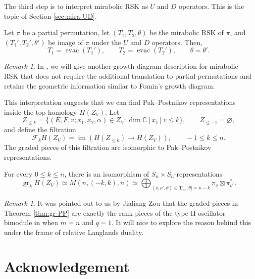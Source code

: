 \documentclass[12pt,a4paper]{article}
\def\evac{\operatorname{evac}}
\theoremstyle{plain}
\newenvironment{repthm}[1]
  {\renewcommand\theinnercustomthm{#1}\innercustomthm}
  {\endinnercustomthm}
\theoremstyle{definition}
\theoremstyle{remark}
\newtheorem{remark}[thm]{Remark}
\newcommand{\gr}{\operatorname{gr}}
\newcommand{\im}{\operatorname{im}}
\newcommand{\bfT}{\mathbf{T}}
\newcommand{\scrF}{\mathscr{F}}
\newcommand{\CC}{\mathbb{C}}
\begin{document}
    The third step is to interpret mirabolic RSK as $U$ and $D$ operators. This is the topic of Section \ref{sec:mira-UD}.

    \begin{repthm}{\ref{thm:mira-UD}}
        Let $\pi$ be a partial permutation, let $(T_1,T_2,\theta)$ be the mirabolic RSK of $\pi$, and $(T_1',T_2',\theta')$ be image of $\pi$ under the $U$ and $D$ operators. Then,
        \[
        T_1 = \evac(T_1'),\qquad T_2 = \evac(T_2'),\qquad \theta = \theta'.
        \]
    \end{repthm}

    \begin{remark}
        In \cite{nguyen2026rsk}, we will give another growth diagram description for mirabolic RSK that does not require the additional translation to partial permutations and retains the geometric information similar to Fomin's growth diagram.
    \end{remark}

    This interpretation suggests that we can find Pak--Postnikov representations inside the top homology $H(Z_V)$. Let
    \[
    Z_{\leq k}=\{(E,F,v;x_1,x_2,\alpha)\in Z_V:\dim \CC[x_1]v\leq k\},\qquad Z_{\le-1}=\varnothing,
    \]
    and define the filtration
    \[
    \scrF_k H(Z_V)=\im \left(H(Z_{\leq k}) \longrightarrow H(Z_V)\right), \qquad -1\leq k\leq n.
    \]
    The graded pieces of this filtration are isomorphic to Pak--Postnikov representations.
    
    \begin{repthm}{\ref{thm:gr-PP}}
        For every $0\leq k\leq n$, there is an isomorphism of $S_n\times S_n$-representations
        \[
        \gr_k H(Z_V) \simeq M(n,(-k,k),n) \simeq \bigoplus_{(\nu,\nu',\theta)\in \bfT_n, |\theta| = n-k} \pi_\nu \boxtimes \pi^*_{\nu'}.
        \]
    \end{repthm}

    \begin{remark}
        It was pointed out to us by Jialiang Zou that the graded pieces in Theorem \ref{thm:gr-PP} are exactly the rank pieces of the type II oscillator bimodule in \cite[Section 4.3]{ma2025theta} when $m = n$ and $q = 1$. It will nice to explore the reason behind this under the frame of relative Langlands duality.
    \end{remark}
    
\section*{Acknowledgement}
\end{document}
